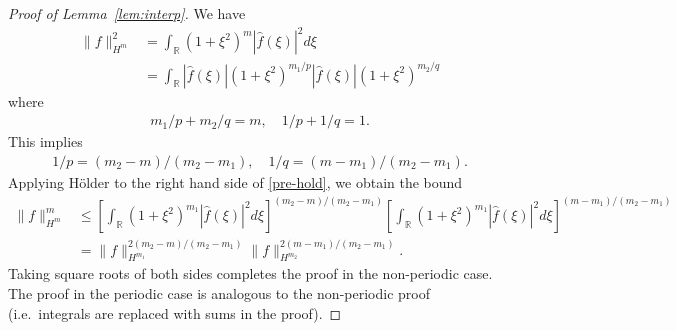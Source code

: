 \documentclass[12pt,reqno]{amsart}
\numberwithin{equation}{section}  %
\numberwithin{figure}{section}
\newcommand{\rr}{\mathbb{R}}
\newcommand{\wh}{\widehat}
\newcommand{\p}{\partial}
\begin{document}
%
%
\begin{proof}[Proof of Lemma~\ref{lem:interp}]
 We have
 \begin{equation}
   \label{pre-hold}
 \begin{split}
   \| f \|_{H^{m}}^{2}
   & = \int_{\rr} (1 + \xi^{2})^{m} | \wh{f}(\xi) |^{2} d \xi
   \\
   & = \int_{\rr} | \wh{f}(\xi) | (1 + \xi^{2})^{m_{1}/p} | \wh{f}(\xi) |
   (1 + \xi^{2})^{m_{2}/q} 
 \end{split}
 \end{equation}
 where
 \begin{equation*}
 \begin{split}
   m_{1}/p + m_{2}/q =m, \quad 1/p + 1/q =1.
 \end{split}
 \end{equation*}
This implies 
 \begin{equation*}
 \begin{split}
   1/p = (m_{2} -m)/(m_{2} -m_{1}), \quad 1/q = (m -m_{1})/(m_{2} -m_{1}). 
 \end{split}
 \end{equation*}
 Applying H\"older to the right hand side of \eqref{pre-hold}, we obtain the
 bound
 \begin{equation*}
 \begin{split}
   \| f \|_{H^{m}}^{m}
   & \le  \left[ \int_{\rr} (1 + \xi^{2})^{m_{1}} | \wh{f}(\xi) |^{2} d \xi
   \right]^{(m_{2} - m)/(m_{2} -m_{1})} \left[ \int_{\rr} (1 + \xi^{2})^{m_{1}}
   | \wh{f}(\xi) |^{2} d \xi \right]^{(m - m_{1})/(m_{2} -m_{1})}
   \\
   & = \| f \|_{H^{m_{1}}}^{2 (m_{2} - m)/(m_{2} -m_{1})}
   \| f \|_{H^{m_{2}}}^{2 (m - m_{1})/(m_{2} -m_{1})}.
 \end{split}
 \end{equation*}
 Taking square roots of both sides completes the proof in the non-periodic case.
 The proof in the periodic case is analogous to the non-periodic proof (i.e.\
 integrals are replaced with sums in the proof).
  \end{proof}
\end{document}
